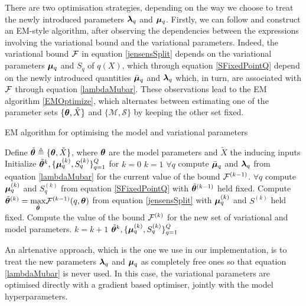 There are two optimisation strategies, depending
on the way we choose to treat the newly introduced parameters $\boldsymbol \lambda_q$ and $\boldsymbol \mu_q$.
Firstly, we can follow \cite{OpperFixedPointCovariance} and construct an EM-style algorithm, after observing the dependencies
between the expressions involving the variational bound and the variational parameters.
Indeed, the variational bound $\mathcal{F}$ in equation \eqref{jensensSplit} depends on the variational parameters
$\boldsymbol \mu_q$ and $S_q$ of $q(X)$, which through equation \eqref{SFixedPointQ} depend on the newly introduced
quantities $\bar{\boldsymbol \mu}_q$ and $\boldsymbol \lambda_q$ which, in turn, are associated with $\mathcal{F}$
through equation \eqref{lambdaMubar}. These observations lead to the EM algorithm \ref{EMOptimize}, which alternates
between estimating one of the parameter sets $\{\boldsymbol \theta, \tilde{X} \}$ and $\{ \mathcal{M}, \mathcal{S} \}$ by keeping the other set fixed.

\begin{algorithm}
\caption{EM algorithm for optimising the model and variational parameters}
\label{EMOptimize}
\begin{algorithmic}
\STATE Define $\tilde{\boldsymbol \theta} \triangleq \{\boldsymbol \theta, \tilde{X} \}$, where $\boldsymbol \theta$ are the model parameters and $\tilde{X}$ the inducing inputs
\STATE Initialize $\tilde{\boldsymbol \theta}^k, \{\boldsymbol \mu_q^{(k)}, S_q^{(k)}\}_{q=1}^Q$ for $k=0$
\STATE $k=1$
\REPEAT
    \STATE $\forall q$ compute $\bar{\boldsymbol \mu}_q$ and $\boldsymbol \lambda_q$ from equation \eqref{lambdaMubar} 
       for the current value of the bound $\mathcal{F}^{(k-1)}$.
	\STATE $\forall q$ compute $\boldsymbol \mu_q^{(k)}$ and $S_q^{(k)}$ from equation \eqref{SFixedPointQ}
	 with $\tilde{\boldsymbol \theta}^{(k-1)}$ held fixed.
	\STATE Compute
	    $\tilde{\boldsymbol \theta}^{(k)} = \underset{\tilde{\boldsymbol \theta}}{\operatorname{max}} \mathcal{F}^{(k-1)}(q, \boldsymbol \theta)$ 
	    from equation \eqref{jensensSplit} with $\boldsymbol \mu_q^{(k)}$ and $S^{(k)}$ held fixed.
	\STATE Compute the value of the bound $\mathcal{F}^{(k)}$ for the new set of variational and model parameters.
    \STATE $k = k+1$
\RETURN $\tilde{\boldsymbol \theta}^k, \{\boldsymbol \mu_q^{(k)}, S_q^{(k)}\}_{q=1}^Q$
\end{algorithmic}
\end{algorithm}

An alrtenative approach, which is the one we use in our implementation, is to treat the new parameters
$\boldsymbol \lambda_q$ and $\boldsymbol \mu_q$ as completely free ones so that equation \eqref{lambdaMubar} is never used. In this case, the
variational parameters are optimised directly with a gradient based optimiser, jointly with the model
hyperparameters.

